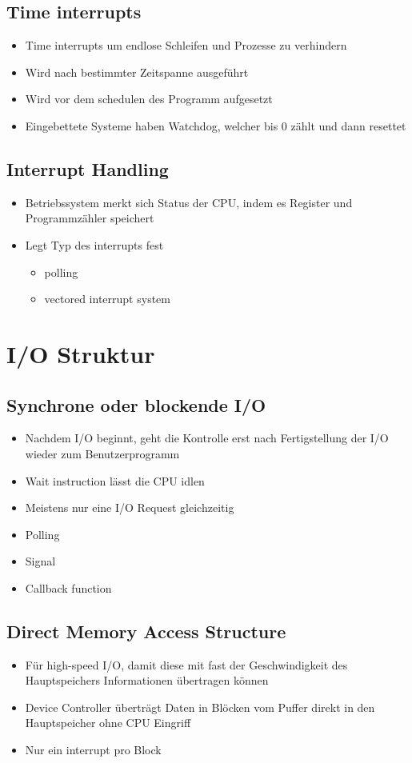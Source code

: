 \documentclass[a4paper]{scrreprt}
\begin{document}
\subsection{Time interrupts}
\begin{itemize}
	\item Time interrupts um endlose Schleifen und Prozesse zu verhindern
	\item Wird nach bestimmter Zeitspanne ausgeführt
	\item Wird vor dem schedulen des Programm aufgesetzt
	\item Eingebettete Systeme haben Watchdog, welcher bis 0 zählt und dann resettet
\end{itemize}

\subsection{Interrupt Handling}
\begin{itemize}
	\item Betriebssystem merkt sich Status der CPU, indem es Register und Programmzähler speichert
	\item Legt Typ des interrupts fest
		\begin{itemize}
			\item polling
			\item vectored interrupt system
		\end{itemize}
\end{itemize}

\section{I/O Struktur}
\subsection{Synchrone oder blockende I/O}
\begin{itemize}
	\item Nachdem I/O beginnt, geht die Kontrolle erst nach Fertigstellung der I/O wieder zum Benutzerprogramm
	\item Wait instruction lässt die CPU idlen
	\item Meistens nur eine I/O Request gleichzeitig
	\item Polling
	\item Signal
	\item Callback function
\end{itemize}

\subsection{Direct Memory Access Structure}
\begin{itemize}
	\item Für high-speed I/O, damit diese mit fast der Geschwindigkeit des Hauptspeichers Informationen übertragen können
	\item Device Controller überträgt Daten in Blöcken vom Puffer direkt in den Hauptspeicher ohne CPU Eingriff
	\item Nur ein interrupt pro Block
\end{itemize}
\end{document}
